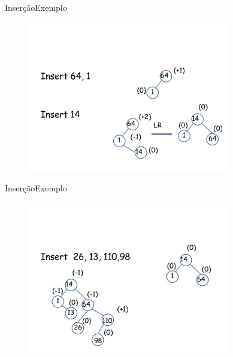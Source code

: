 \documentclass[aspectratio=169]{beamer}
\begin{document}

\begin{frame}{Inserção}{Exemplo}
\begin{figure}[!h]
  \centering
  \includegraphics[width=250pt]{imagens/exemplo_insercao1.png}
  \label{fig_exemplo_insercao1}
\end{figure}
\end{frame}



\begin{frame}{Inserção}{Exemplo}
\begin{figure}[!h]
  \centering
  \includegraphics[width=250pt]{imagens/exemplo_insercao2.png}
  \label{fig_exemplo_insercao2}
\end{figure}
\end{frame}


\end{document}
